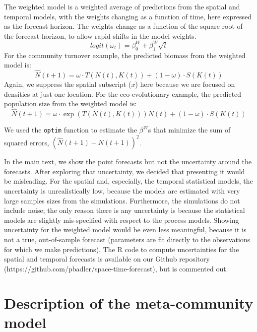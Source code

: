 \documentclass[11pt]{article}
\begin{document}
The weighted model is a weighted average of predictions from the spatial and temporal models, with the weights changing as a function of time, here expressed as the forecast horizon. The weights change as a function of the square root of the forecast horizon, to allow rapid shifts in the model weights. 
\begin{equation}
logit(\omega_t)=\beta^W_0 + \beta^W_1 \sqrt{t}
\label{eqn:weights}
\end{equation}
For the community turnover example, the predicted biomass from the weighted model is:
\begin{equation}
\hat{N}(t+1)= \omega \cdot T(N(t),K(t)) + (1-\omega) \cdot S(K(t)) 
\label{eqn:combined_model1}
\end{equation}
Again, we suppress the spatial subscript ($x$) here because we are focused on densities at just one location. For the eco-evolutionary example, the predicted population size from the weighted model is:
\begin{equation}
\hat{N}(t+1) = \omega \cdot \exp(T(N(t),K(t))) N(t) + (1-\omega) \cdot S(K(t)) 
\label{eqn:combined_model2}
\end{equation}

We used the \texttt{optim} function to estimate the $\beta^W$s that minimize the sum of squared errors, $(\hat{N}(t+1) - N(t+1))^2$.

In the main text, we show the point forecasts but not the uncertainty around the forecasts. After exploring that uncertainty, we decided that presenting it would be misleading. For the spatial and, especially, the temporal statistical models, the uncertainty is unrealistically low, because the models are estimated with very large samples sizes from the simulations. Furthermore, the simulations do not include noise; the only reason there is any uncertainty is because the statistical models are slightly mis-specified with respect to the process models. Showing uncertainty for the weighted model would be even less meaningful, because it is not a true, out-of-sample forecast (parameters are fit directly to the observations for which we make predictions). The R code to compute uncertainties for the spatial and temporal forecasts is available on our Github repository (https://github.com/pbadler/space-time-forecast), but is commented out.

\section{Description of the meta-community model}\label{metacomm}
\end{document}
